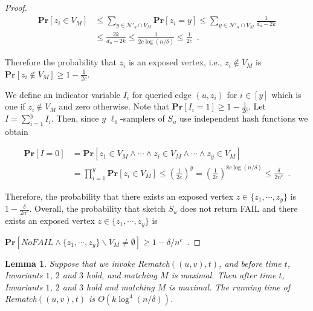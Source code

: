 \documentclass[11pt,letter]{article}
\newtheorem{lemma}[theorem]{Lemma}
\renewcommand{\Pr}[1]{\ensuremath{\mathbf{Pr}[#1]}}
\begin{document}
\begin{proof}
\begin{align*}
\Pr{z_i \in V_M }
  &   \le \sum_{y\in \mathcal{N}'_u \cap V_M} \Pr{z_i=y}
    \le \sum_{y\in \mathcal{N}'_u \cap V_M} \frac{1}{d_u-2k}
\\
&
    \le \frac{2k}{d_u-2k}\le \frac{1}{2c\log(n/\delta)}
    \le \frac{1}{2c}\enspace .
\end{align*}

Therefore the probability that $z_i$ is an exposed vertex, i.e., $z_i\notin V_M$
is $\Pr{z_i \notin V_M }\ge 1- \frac{1}{2c}$.

We define an indicator variable $I_i$ for queried edge $(u,z_i)$ for $i\in[y]$
which is one if $z_i \notin V_M $ and zero otherwise.
Note that $\Pr{I_i=1}\ge 1- \frac{1}{2c}$. Let $I=\sum_{i=1}^y I_i$.
Then, since $y$ $\ell_0$-samplers of $S_u$ use independent hash functions
we obtain

\[
  \begin{split}
   \Pr{I=0}
   &= \Pr{z_1\in V_M \wedge \cdots \wedge z_i\in V_M \wedge \cdots \wedge z_y\in V_M}\\
   &= \prod_{i=1}^{y} \Pr{z_i \in V_M}
\le (\frac{1}{2c})^y= (\frac{1}{2c})^{8c\log(n/\delta)}
   \le \frac{\delta}{2n^c} \enspace .
  \end{split}
\]

Therefore, the probability that there exists an exposed vertex $z\in \{z_1,\cdots,z_y\}$
is $1-\frac{\delta}{2n^c}$.
Overall, the probability that sketch $S_u$
does not return FAIL and there exists an exposed vertex
$z\in \{z_1,\cdots,z_y\}$ is

\smallskip
{$\displaystyle
  \Pr{NoFAIL \wedge \{z_1,\cdots,z_y\}\backslash V_M\neq \emptyset}\ge 1-\delta/n^c\enspace.$}
\end{proof}

\begin{lemma}
\label{lem:timestamps:case:6}
Suppose that we invoke {\sf Rematch$((u,v),t)$}, and
 before time $t$, Invariants $1$, $2$ and $3$ hold,
and matching $M$ is maximal.
Then after time $t$, Invariants $1$, $2$ and $3$ hold and
matching $M$ is maximal.
The running time of  {\sf Rematch$((u,v),t)$} is $O(k\log^4(n/\delta))$.
\end{lemma}
\end{document}

